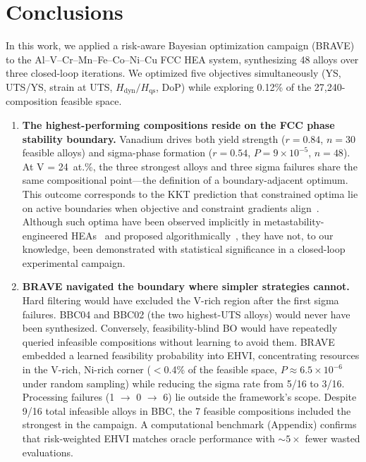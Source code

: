 \documentclass[preprint,12pt,times]{elsarticle}  %
\begin{document}
\section{Conclusions}\label{sec:Conclusion}

In this work, we applied a risk-aware Bayesian optimization campaign (BRAVE) to the Al--V--Cr--Mn--Fe--Co--Ni--Cu FCC HEA system, synthesizing 48 alloys over three closed-loop iterations. We optimized five objectives simultaneously (YS, UTS/YS, strain at UTS, $H_\text{dyn}/H_\text{qs}$, DoP) while exploring 0.12\% of the 27,240-composition feasible space.

\begin{enumerate}

\item \textbf{The highest-performing compositions reside on the FCC phase stability boundary.} Vanadium drives both yield strength ($r = 0.84$, $n = 30$ feasible alloys) and sigma-phase formation ($r = 0.54$, $P = 9 \times 10^{-5}$, $n = 48$). At V = 24~at.\%, the three strongest alloys and three sigma failures share the same compositional point---the definition of a boundary-adjacent optimum. This outcome corresponds to the KKT prediction that constrained optima lie on active boundaries when objective and constraint gradients align~\cite{nocedal2006numerical, ray2009infeasibility}. Although such optima have been observed implicitly in metastability-engineered HEAs~\cite{li2016metastable} and proposed algorithmically~\cite{tian2024boundary, maguire2025good}, they have not, to our knowledge, been demonstrated with statistical significance in a closed-loop experimental campaign.

\item \textbf{BRAVE navigated the boundary where simpler strategies cannot.} Hard filtering would have excluded the V-rich region after the first sigma failures. BBC04 and BBC02 (the two highest-UTS alloys) would never have been synthesized. Conversely, feasibility-blind BO would have repeatedly queried infeasible compositions without learning to avoid them. BRAVE embedded a learned feasibility probability into EHVI, concentrating resources in the V-rich, Ni-rich corner ($<$0.4\% of the feasible space, $P \approx 6.5 \times 10^{-6}$ under random sampling) while reducing the sigma rate from 5/16 to 3/16. Processing failures (1 $\rightarrow$ 0 $\rightarrow$ 6) lie outside the framework's scope. Despite 9/16 total infeasible alloys in BBC, the 7 feasible compositions included the strongest in the campaign. A computational benchmark (Appendix) confirms that risk-weighted EHVI matches oracle performance with ${\sim}5\times$ fewer wasted evaluations.


\end{enumerate}
\end{document}
